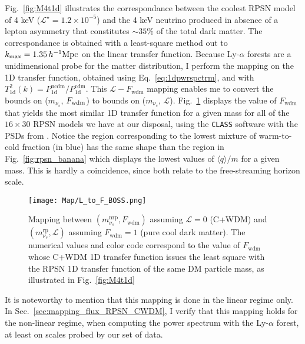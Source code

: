 Fig.~\ref{fig:M4t1d} illustrates the correspondance between the coolest RPSN model of 4 keV ($\mathcal{L}^\star = 1.2 \times 10^{-5}$) and the 4 keV neutrino produced in absence of a lepton asymmetry that constitutes $\sim 35\%$ of the total dark matter. The correspondance is obtained with a least-square method out to $k_{\rm max} = 1.35\,h^{-1}{\rm Mpc}$ on the linear transfer function. Because Ly-$\alpha$ forests are a unidimensional probe for the matter distribution, I perform the mapping on the 1D transfer function, obtained using Eq.~\ref{eq:1dpwrspctrm}, and with $T^2_{\mathrm{1d}} (k) = P_{\mathrm{1d}}^{\mathrm{ncdm}} / P_{\mathrm{1d}}^{\mathrm{cdm}}$. This $\mathcal{L}-F_{\mathrm{wdm}}$ mapping enables me to convert the bounds on ($m_{\nu_s}$, $F_{\rm{wdm}}$) to bounds on ($m_{\nu_s}$, $\mathcal{L}$). Fig.~\ref{fig:L_to_F_map} displays the value of $F_{\mathrm{wdm}}$ that yields the most similar 1D transfer function for a given mass for all of the $16 \times 30$ RPSN models we have at our disposal, using the \texttt{CLASS} software with the PSDs from \cite{LaineMSM, Ghiglieri2015jua}. Notice the region corresponding to the lowest mixture of warm-to-cold fraction (in blue) has the same shape than the region in Fig.~\ref{fig:rpsn_banana} which displays the lowest values of $\langle q \rangle / m$ for a given mass. This is hardly a coincidence, since both relate to the free-streaming horizon scale. \\

\begin{figure}
\begin{center}
\texttt{[image: Map/L\_to\_F\_BOSS.png]}
\caption{Mapping between $\left( m_{\nu_s}^{\mathrm{nrp}}, F_{\mathrm{wdm}} \right)$ assuming $\mathcal{L}=0$ (C+WDM) and $\left( m_{\nu_s}^{\mathrm{rp}}, \mathcal{L} \right)$ assuming $F_{\mathrm{wdm}}=1$ (pure cool dark matter). The numerical values and color code correspond to the value of $F_{\mathrm{wdm}}$ whose C+WDM 1D transfer function issues the least square with the RPSN 1D transfer function of the same DM particle mass, as illustrated in Fig.~\ref{fig:M4t1d}}
\label{fig:L_to_F_map}
\end{center}
\end{figure}

It is noteworthy to mention that this mapping is done in the linear regime only. In Sec.~\ref{sec:mapping_flux_RPSN_CWDM}, I verify that this mapping holds for the non-linear regime, when computing the power spectrum with the Ly-$\alpha$ forest, at least on scales probed by our set of data. 

